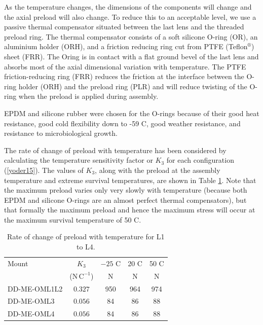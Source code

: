 \documentclass{report}
\newcommand{\unit}[1]{\ensuremath{\mathrm{#1}}}
\begin{document}
As the temperature changes, the dimensions of the components will change and the axial preload will also change. To reduce this to an acceptable level, we use a passive thermal compensator situated between the last lens and the threaded preload ring. The thermal compensator consists of a soft silicone O-ring (OR), an aluminium holder (ORH), and a friction reducing ring cut from PTFE (Teflon${}^\circledR $) sheet (FRR). The Oring is in contact with a flat ground bevel of the last lens and absorbs most of the axial dimensional variation with temperature. The PTFE friction-reducing ring (FRR) reduces the friction at the interface between the O-ring holder (ORH) and the preload ring (PLR) and will reduce twisting of the O-ring when the preload is applied during assembly.

EPDM and silicone rubber were chosen for the O-rings because of their good heat resistance, good cold flexibility down to -59 C, good weather resistance, and resistance to microbiological growth.

The rate of change of preload with temperature has been considered by calculating the temperature sensitivity factor or $K_3$ for each configuration (\ref{yoder15}). The values of $K_3$, along with the preload at the assembly temperature and extreme survival temperatures, are shown in Table \ref{table:preloads}. Note that the maximum preload varies only very slowly with temperature (because both EPDM and silicone O-rings are an almost perfect thermal compensators), but that formally the maximum preload and hence the maximum stress will occur at the maximum survival temperature of 50 C.

\begin{table}
\caption{Rate of change of preload with temperature for L1 to L4.}
\label{table:preloads}
\begin{center}
\small
\begin{tabular}{lcccc}
\hline
\hline
Mount&$K_3$&$-25$ C&20 C&50 C\\
&($\unit{N\,C^{-1}}$)&N&N&N\\
\hline
DD-ME-OML1L2   &$0.327$&\phantom{}950&\phantom{}964&\phantom{}974\\
DD-ME-OML3     &$0.056$&\phantom{0}84&\phantom{0}86&\phantom{0}88\\
DD-ME-OML4     &$0.056$&\phantom{0}84&\phantom{0}86&\phantom{0}88\\
\hline
\end{tabular}
\end{center}
\end{table}
\end{document}
